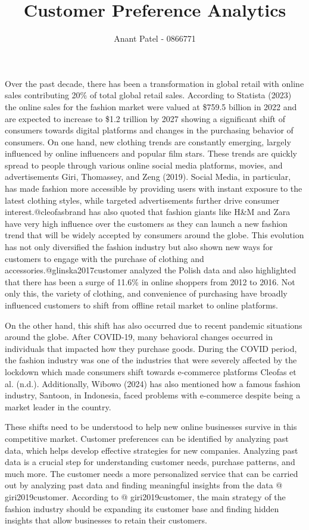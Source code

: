 \documentclass[
  letterpaper,
  DIV=11,
  numbers=noendperiod]{scrartcl}
\title{Customer Preference Analytics}
\author{Anant Patel - 0866771}
\date{}
\begin{document}
\maketitle


Over the past decade, there has been a transformation in global retail
with online sales contributing 20\% of total global retail sales.
According to Statista (2023) the online sales for the fashion market
were valued at \$759.5 billion in 2022 and are expected to increase to
\$1.2 trillion by 2027 showing a significant shift of consumers towards
digital platforms and changes in the purchasing behavior of consumers.
On one hand, new clothing trends are constantly emerging, largely
influenced by online influencers and popular film stars. These trends
are quickly spread to people through various online social media
platforms, movies, and advertisements Giri, Thomassey, and Zeng (2019).
Social Media, in particular, has made fashion more accessible by
providing users with instant exposure to the latest clothing styles,
while targeted advertisements further drive consumer
interest.@cleofasbrand has also quoted that fashion giants like H\&M and
Zara have very high influence over the customers as they can launch a
new fashion trend that will be widely accepted by consumers around the
globe. This evolution has not only diversified the fashion industry but
also shown new ways for customers to engage with the purchase of
clothing and accessories.@glinska2017customer analyzed the Polish data
and also highlighted that there has been a surge of 11.6\% in online
shoppers from 2012 to 2016. Not only this, the variety of clothing, and
convenience of purchasing have broadly influenced customers to shift
from offline retail market to online platforms.

On the other hand, this shift has also occurred due to recent pandemic
situations around the globe. After COVID-19, many behavioral changes
occurred in individuals that impacted how they purchase goods. During
the COVID period, the fashion industry was one of the industries that
were severely affected by the lockdown which made consumers shift
towards e-commerce platforms Cleofas et al. (n.d.). Additionally, Wibowo
(2024) has also mentioned how a famous fashion industry, Santoon, in
Indonesia, faced problems with e-commerce despite being a market leader
in the country.

These shifts need to be understood to help new online businesses survive
in this competitive market. Customer preferences can be identified by
analyzing past data, which helps develop effective strategies for new
companies. Analyzing past data is a crucial step for understanding
customer needs, purchase patterns, and much more. The customer needs a
more personalized service that can be carried out by analyzing past data
and finding meaningful insights from the data @ giri2019customer.
According to @ giri2019customer, the main strategy of the fashion
industry should be expanding its customer base and finding hidden
insights that allow businesses to retain their customers.
\end{document}
